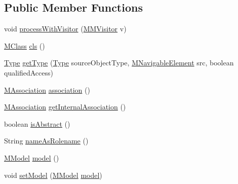 \subsection*{Public Member Functions}
\begin{DoxyCompactItemize}
\item 
void \hyperlink{classorg_1_1tzi_1_1use_1_1uml_1_1mm_1_1_m_association_class_impl_a4e877bbba869765fd666a6e04e779b3d}{process\-With\-Visitor} (\hyperlink{interfaceorg_1_1tzi_1_1use_1_1uml_1_1mm_1_1_m_m_visitor}{M\-M\-Visitor} v)
\item 
\hyperlink{interfaceorg_1_1tzi_1_1use_1_1uml_1_1mm_1_1_m_class}{M\-Class} \hyperlink{classorg_1_1tzi_1_1use_1_1uml_1_1mm_1_1_m_association_class_impl_aa759163a8fdc1a248abd8183235839e0}{cls} ()
\item 
\hyperlink{interfaceorg_1_1tzi_1_1use_1_1uml_1_1ocl_1_1type_1_1_type}{Type} \hyperlink{classorg_1_1tzi_1_1use_1_1uml_1_1mm_1_1_m_association_class_impl_a20e12cbb6b29192e36f1b180b27c4f7e}{get\-Type} (\hyperlink{interfaceorg_1_1tzi_1_1use_1_1uml_1_1ocl_1_1type_1_1_type}{Type} source\-Object\-Type, \hyperlink{interfaceorg_1_1tzi_1_1use_1_1uml_1_1mm_1_1_m_navigable_element}{M\-Navigable\-Element} src, boolean qualified\-Access)
\item 
\hyperlink{interfaceorg_1_1tzi_1_1use_1_1uml_1_1mm_1_1_m_association}{M\-Association} \hyperlink{classorg_1_1tzi_1_1use_1_1uml_1_1mm_1_1_m_association_class_impl_a890b52e2cbc4389a4451d7d6fef6b984}{association} ()
\item 
\hyperlink{interfaceorg_1_1tzi_1_1use_1_1uml_1_1mm_1_1_m_association}{M\-Association} \hyperlink{classorg_1_1tzi_1_1use_1_1uml_1_1mm_1_1_m_association_class_impl_a8150f77e4641f25c4137d0f1f65c319b}{get\-Internal\-Association} ()
\item 
boolean \hyperlink{classorg_1_1tzi_1_1use_1_1uml_1_1mm_1_1_m_association_class_impl_a69875a7566e830b5d7d4dee3a361349f}{is\-Abstract} ()
\item 
String \hyperlink{classorg_1_1tzi_1_1use_1_1uml_1_1mm_1_1_m_association_class_impl_a614389fedc639fccf2de573d5557dac3}{name\-As\-Rolename} ()
\item 
\hyperlink{classorg_1_1tzi_1_1use_1_1uml_1_1mm_1_1_m_model}{M\-Model} \hyperlink{classorg_1_1tzi_1_1use_1_1uml_1_1mm_1_1_m_association_class_impl_a0075043eefa5817decb4266eef9713c2}{model} ()
\item 
void \hyperlink{classorg_1_1tzi_1_1use_1_1uml_1_1mm_1_1_m_association_class_impl_ab2fd0b13e67908fb185b1f83e6358f4c}{set\-Model} (\hyperlink{classorg_1_1tzi_1_1use_1_1uml_1_1mm_1_1_m_model}{M\-Model} \hyperlink{classorg_1_1tzi_1_1use_1_1uml_1_1mm_1_1_m_association_class_impl_a0075043eefa5817decb4266eef9713c2}{model})

\end{DoxyCompactItemize}
